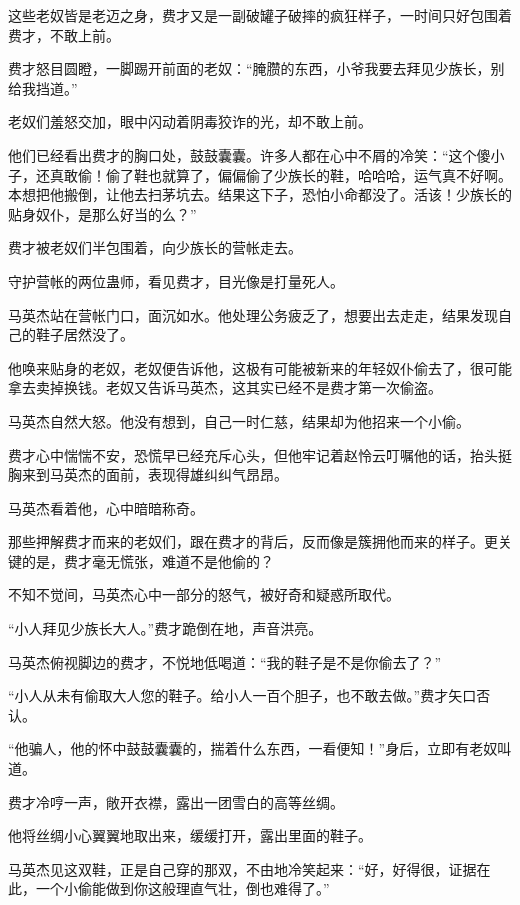 
\begin{this_body}

这些老奴皆是老迈之身，费才又是一副破罐子破摔的疯狂样子，一时间只好包围着费才，不敢上前。

费才怒目圆瞪，一脚踢开前面的老奴：“腌臜的东西，小爷我要去拜见少族长，别给我挡道。”

老奴们羞怒交加，眼中闪动着阴毒狡诈的光，却不敢上前。

他们已经看出费才的胸口处，鼓鼓囊囊。许多人都在心中不屑的冷笑：“这个傻小子，还真敢偷！偷了鞋也就算了，偏偏偷了少族长的鞋，哈哈哈，运气真不好啊。本想把他搬倒，让他去扫茅坑去。结果这下子，恐怕小命都没了。活该！少族长的贴身奴仆，是那么好当的么？”

费才被老奴们半包围着，向少族长的营帐走去。

守护营帐的两位蛊师，看见费才，目光像是打量死人。

马英杰站在营帐门口，面沉如水。他处理公务疲乏了，想要出去走走，结果发现自己的鞋子居然没了。

他唤来贴身的老奴，老奴便告诉他，这极有可能被新来的年轻奴仆偷去了，很可能拿去卖掉换钱。老奴又告诉马英杰，这其实已经不是费才第一次偷盗。

马英杰自然大怒。他没有想到，自己一时仁慈，结果却为他招来一个小偷。

费才心中惴惴不安，恐慌早已经充斥心头，但他牢记着赵怜云叮嘱他的话，抬头挺胸来到马英杰的面前，表现得雄纠纠气昂昂。

马英杰看着他，心中暗暗称奇。

那些押解费才而来的老奴们，跟在费才的背后，反而像是簇拥他而来的样子。更关键的是，费才毫无慌张，难道不是他偷的？

不知不觉间，马英杰心中一部分的怒气，被好奇和疑惑所取代。

“小人拜见少族长大人。”费才跪倒在地，声音洪亮。

马英杰俯视脚边的费才，不悦地低喝道：“我的鞋子是不是你偷去了？”

“小人从未有偷取大人您的鞋子。给小人一百个胆子，也不敢去做。”费才矢口否认。

“他骗人，他的怀中鼓鼓囊囊的，揣着什么东西，一看便知！”身后，立即有老奴叫道。

费才冷哼一声，敞开衣襟，露出一团雪白的高等丝绸。

他将丝绸小心翼翼地取出来，缓缓打开，露出里面的鞋子。

马英杰见这双鞋，正是自己穿的那双，不由地冷笑起来：“好，好得很，证据在此，一个小偷能做到你这般理直气壮，倒也难得了。”


\end{this_body}
